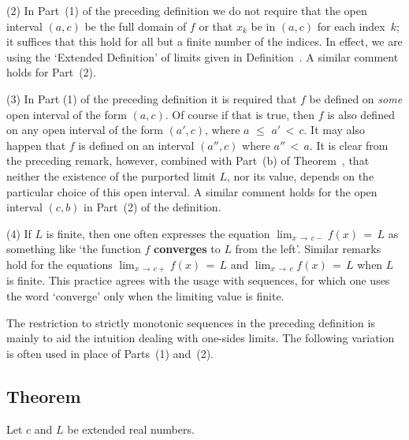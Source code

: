 \V

        (2) In Part~(1) of the preceding definition we do not require that the open interval  $(a,c)$ be the full domain of $f$ or that $x_{k}$ be in $(a,c)$ for each index~$k$;
    it suffices that this hold for all but a finite number of the indices. In effect,
    we are using the `Extended Definition' of limits given in Definition~. A similar comment holds for Part~(2).

\V

        (3) In Part (1) of the preceding definition it is required that $f$ be defined on {\em some} open interval of the form $(a,c)$.
    Of course if that is true, then $f$ is also defined on any open interval of the form $(a',c)$, where $a\,\,{\leq}\,\,a'\,<\,c$.
    It may also happen that $f$ is defined on an interval $(a'',c)$ where $a''\,<\,a$.
    It is clear from the preceding remark, however, combined with Part~(b) of Theorem~,
    that neither the existence of the purported limit $L$, nor its value, depends on the particular choice of this open interval.
    A similar comment holds for the open interval $(c,b)$ in Part~(2) of the definition.

\V

        (4) If $L$ is finite, then one often expresses the equation $\lim_{x \,{\rightarrow}\, c-} f(x) \,=\, L$
    as something like `the function $f$ {\bf converges} to $L$ from the left'. Similar remarks hold for the equations
    $\lim_{x \,{\rightarrow}\, c+} f(x) \,=\, L$ and $\lim_{x \,{\rightarrow}\, c} f(x) \,=\, L$ when $L$ is finite.
    This practice agrees with the usage with sequences, for which one uses the word `converge' only when the limiting value is finite.

\VV

        The restriction to strictly monotonic sequences in the preceding definition is mainly to aid the intuition dealing with one-sides limits.
    The following variation is often used in place of Parts~(1) and~(2).

\V

            \subsection{\small{\bf Theorem}}
            \label{ThmD50.25}

\V

        Let $c$ and $L$ be extended real numbers.

\V

